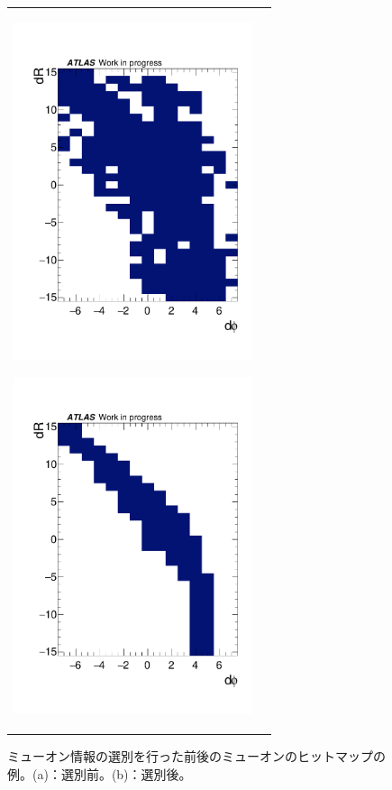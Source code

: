 \begin{figure}[tb]
    \begin{tabular}{cc}
    \centering
    \begin{minipage}[b]{0.45\hsize}%
        \centering
        \hspace*{-1cm}
        \includegraphics[clip, width=7cm]{fig/4/data_phi0_roi33_before.pdf}
        \subcaption{}
        \label{4-53be}
    \end{minipage}%
    \begin{minipage}[b]{0.6\hsize}%
        \centering
        \hspace*{-1cm}
        \includegraphics[clip, width=7cm]{fig/4/data_phi0_roi33_after.pdf}
        \subcaption{}
        \label{4-53af}
    \end{minipage}%
    \end{tabular}
    \caption{ミューオン情報の選別を行った前後のミューオンのヒットマップの例。(a)：選別前。(b)：選別後。}
    \label{fig:hitmapcleaner}
\end{figure}


